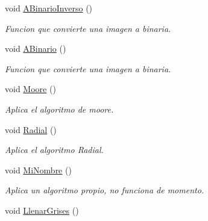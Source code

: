 \begin{DoxyCompactItemize}
\mbox{\label{class_algoritmos_a1264b2cf8259abcb8e75a2737caeb57a}} 
void \hyperlink{class_algoritmos_a1264b2cf8259abcb8e75a2737caeb57a}{A\+Binario\+Inverso} ()
\begin{DoxyCompactList}\small\item\em Funcion que convierte una imagen a binaria. \end{DoxyCompactList}\item 
\mbox{\label{class_algoritmos_aacbc6d1f685811405cc0cddd5d2f5d74}} 
void \hyperlink{class_algoritmos_aacbc6d1f685811405cc0cddd5d2f5d74}{A\+Binario} ()
\begin{DoxyCompactList}\small\item\em Funcion que convierte una imagen a binaria. \end{DoxyCompactList}\item 
\mbox{\label{class_algoritmos_ae3d314579f3f1858885bf664dfeebd41}} 
void \hyperlink{class_algoritmos_ae3d314579f3f1858885bf664dfeebd41}{Moore} ()
\begin{DoxyCompactList}\small\item\em Aplica el algoritmo de moore. \end{DoxyCompactList}\item 
\mbox{\label{class_algoritmos_ab152ee76a12c86e11181fb0a6c5561c9}} 
void \hyperlink{class_algoritmos_ab152ee76a12c86e11181fb0a6c5561c9}{Radial} ()
\begin{DoxyCompactList}\small\item\em Aplica el algoritmo Radial. \end{DoxyCompactList}\item 
\mbox{\label{class_algoritmos_a05314717bfd98f043c8c82638831ffd5}} 
void \hyperlink{class_algoritmos_a05314717bfd98f043c8c82638831ffd5}{Mi\+Nombre} ()
\begin{DoxyCompactList}\small\item\em Aplica un algoritmo propio, no funciona de momento. \end{DoxyCompactList}\item 
\mbox{\label{class_algoritmos_a1c76545e06112e34c6d296ff080af11d}} 
void \hyperlink{class_algoritmos_a1c76545e06112e34c6d296ff080af11d}{Llenar\+Grises} ()

\end{DoxyCompactItemize}

